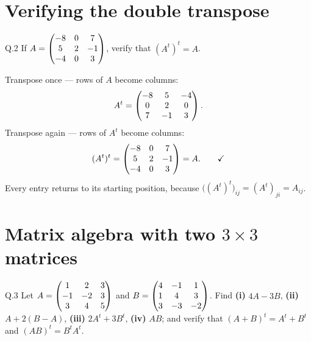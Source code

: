 \section{Verifying the double transpose}

\begin{question}{Q.2}
If $A=\begin{pmatrix}-8&0&7\\5&2&-1\\-4&0&3\end{pmatrix}$, verify that $(A^{t})^{t}=A$.
\end{question}

\begin{solution}
Transpose once --- rows of $A$ become columns:
\[
A^{t}=\begin{pmatrix}-8&5&-4\\0&2&0\\7&-1&3\end{pmatrix}.
\]
Transpose again --- rows of $A^{t}$ become columns:
\[
(A^{t})^{t}=\begin{pmatrix}-8&0&7\\5&2&-1\\-4&0&3\end{pmatrix}=A . \qquad\checkmark
\]
Every entry returns to its starting position, because
$\bigl((A^{t})^{t}\bigr)_{ij}=(A^{t})_{ji}=A_{ij}$.

\end{solution}

\section{Matrix algebra with two $3\times3$ matrices}

\begin{question}{Q.3}
Let $A=\begin{pmatrix}1&2&3\\-1&-2&3\\3&4&5\end{pmatrix}$ and $B=\begin{pmatrix}4&-1&1\\1&4&3\\3&-3&-2\end{pmatrix}$.
Find \textbf{(i)} $4A-3B$, \textbf{(ii)} $A+2(B-A)$, \textbf{(iii)}
$2A^{t}+3B^{t}$, \textbf{(iv)} $AB$; and verify that
$(A+B)^{t}=A^{t}+B^{t}$ and $(AB)^{t}=B^{t}A^{t}$.
\end{question}

